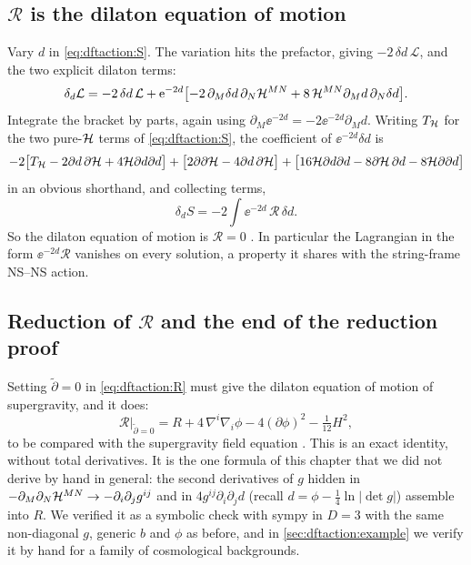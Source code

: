 \subsection{\texorpdfstring{$\mathcal R$}{R} is the dilaton equation of motion}
Vary $d$ in \eqref{eq:dftaction:S}. The variation hits the prefactor, giving $-2\,\delta d\,
\mathcal L$, and the two explicit dilaton terms:
\[
\delta_d\mathcal L=-2\,\delta d\,\mathcal L+\mathrm{e}^{-2d}\bigl[-2\,\partial_M\delta d\,\partial_N
\mathcal{H}^{MN}+8\,\mathcal{H}^{MN}\partial_Md\,\partial_N\delta d\bigr].
\]
Integrate the bracket by parts, again using $\partial_M\ee^{-2d}=-2\ee^{-2d}\partial_Md$. Writing
$T_{\mathcal{H}}$ for the two pure-$\mathcal{H}$ terms of \eqref{eq:dftaction:S}, the coefficient of
$\ee^{-2d}\delta d$ is
\[
-2\bigl[T_{\mathcal{H}}-2\partial d\,\partial\mathcal{H}+4\mathcal{H}\partial d\partial d\bigr]
+\bigl[2\partial\partial\mathcal{H}-4\partial d\,\partial\mathcal{H}\bigr]
+\bigl[16\mathcal{H}\partial d\partial d-8\partial\mathcal{H}\,\partial d-8\mathcal{H}\partial\partial d\bigr]
\]
in an obvious shorthand, and collecting terms,
\begin{equation}\label{eq:dftaction:deom}
\delta_dS=-2\int\ee^{-2d}\,\mathcal R\,\delta d .
\end{equation}
So the dilaton equation of motion is $\mathcal R=0$ . In particular the Lagrangian in the form $\ee^{-2d}\mathcal R$ vanishes on every
solution, a property it shares with the string-frame NS--NS action.

\subsection{Reduction of \texorpdfstring{$\mathcal R$}{R} and the end of the reduction proof}
Setting $\tilde\partial=0$ in \eqref{eq:dftaction:R} must give the dilaton equation of motion
of supergravity, and it does:
\begin{equation}\label{eq:dftaction:Rred}
\mathcal R\Big|_{\tilde\partial=0}=R+4\,\nabla^i\nabla_i\phi-4(\partial\phi)^2-\tfrac1{12}H^2,
\end{equation}
to be compared with the supergravity field equation .
This is an exact identity, without total derivatives. It is the one formula of this chapter
that we did not derive by hand in general: the second derivatives of $g$ hidden in
$-\partial_M\partial_N\mathcal{H}^{MN}\to-\partial_i\partial_jg^{ij}$ and in
$4g^{ij}\partial_i\partial_jd$ (recall $d=\phi-\tfrac14\ln|\det g|$) assemble into $R$. We
verified it as a symbolic check with sympy in $D=3$ with the same non-diagonal $g$, generic $b$
and $\phi$ as before, and in \cref{sec:dftaction:example} we verify it by hand for a family of
cosmological backgrounds.

